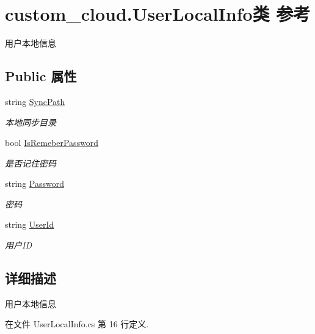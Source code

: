 \hypertarget{classcustom__cloud_1_1_user_local_info}{}\section{custom\+\_\+cloud.\+User\+Local\+Info类 参考}
\label{classcustom__cloud_1_1_user_local_info}


用户本地信息  


\subsection*{Public 属性}
\begin{DoxyCompactItemize}
\item 
string \hyperlink{classcustom__cloud_1_1_user_local_info_aad9b5bfe1626ad91d82cd324c6a59d8c}{Sync\+Path}
\begin{DoxyCompactList}\small\item\em 本地同步目录 \end{DoxyCompactList}\item 
bool \hyperlink{classcustom__cloud_1_1_user_local_info_a4648d979393539108f64b9e47b8f67cc}{Is\+Remeber\+Password}
\begin{DoxyCompactList}\small\item\em 是否记住密码 \end{DoxyCompactList}\item 
string \hyperlink{classcustom__cloud_1_1_user_local_info_a4d83318b3103bfbe9f46c7e5d911fba9}{Password}
\begin{DoxyCompactList}\small\item\em 密码 \end{DoxyCompactList}\item 
string \hyperlink{classcustom__cloud_1_1_user_local_info_a88a5abace43fab405e5b54d5b8548f96}{User\+Id}
\begin{DoxyCompactList}\small\item\em 用户\+ID \end{DoxyCompactList}\end{DoxyCompactItemize}


\subsection{详细描述}
用户本地信息 



在文件 User\+Local\+Info.\+cs 第 16 行定义.



